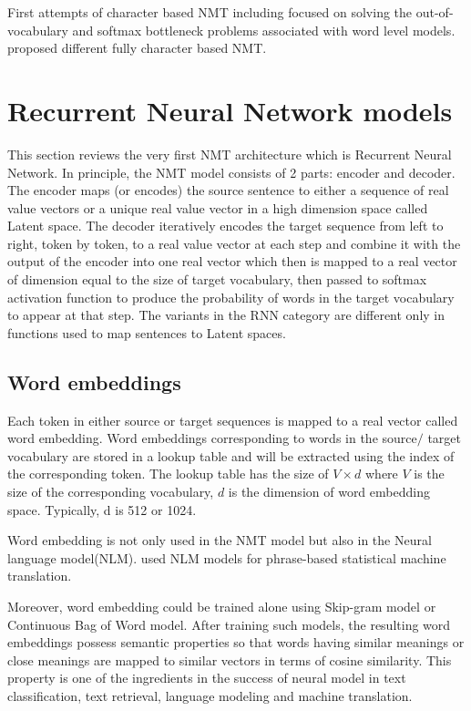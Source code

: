 First attempts of character based NMT including \cite{wang15character,luong16achieving} focused on solving the out-of-vocabulary and softmax bottleneck problems associated with word level models. \cite{costa16character,lee17fully,chung16character,costa17byte} proposed different fully character based NMT.
\section{Recurrent Neural Network models}
This section reviews the very first NMT architecture which is Recurrent Neural Network. In principle, the NMT model consists of 2 parts: encoder and decoder. The encoder maps (or encodes) the source sentence to either a sequence of real value vectors or a unique real value vector in a high dimension space called Latent space. The decoder iteratively encodes the target sequence from left to right, token by token, to a real value vector at each step and combine it with the output of the encoder into one real vector which then is mapped to a real vector of dimension equal to the size of target vocabulary, then passed to softmax activation function to produce the probability of words in the target vocabulary to appear at that step. The variants in the RNN category are different only in functions used to map sentences to Latent spaces.
\subsection{Word embeddings}
Each token in either source or target sequences is mapped to a real vector called word embedding. Word embeddings corresponding to words in the source$/$ target vocabulary are stored in a lookup table and will be extracted using the index of the corresponding token. The lookup table has the size of $V \times d$ where $V$ is the size of the corresponding vocabulary, $d$ is the dimension of word embedding space. Typically, d is 512 or 1024.

Word embedding is not only used in the NMT model but also in the Neural language model\citep{bengio03aneural}(NLM). \cite{le12continuous,schwenk12continuous} used NLM models for phrase-based statistical machine translation.

Moreover, word embedding could be trained alone using Skip-gram model\citep{mikolov13distributed} or Continuous Bag of Word model\citep{mikolov13efficient}. After training such models, the resulting word embeddings possess semantic properties so that words having similar meanings or close meanings are mapped to similar vectors in terms of cosine similarity\citep{collobert11natural,mikolov13distributed}. This property is one of the ingredients in the success of neural model in text classification, text retrieval, language modeling and machine translation.

